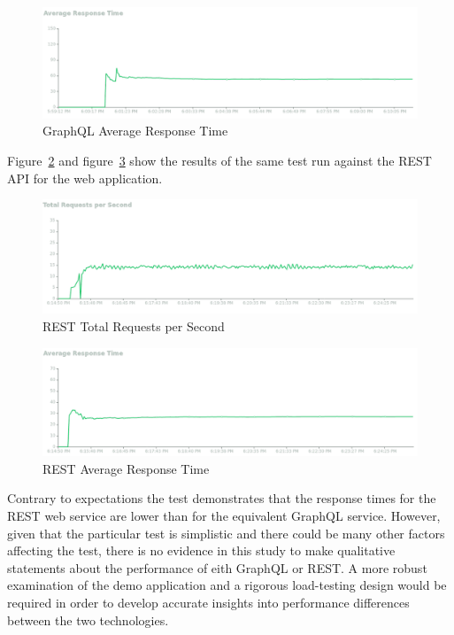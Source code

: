 \begin{figure}[htb]
  \centering\includegraphics[width=\columnwidth]
  {./images/graphql_response.png}
  \caption{GraphQL Average Response Time}\label{f:graphql_response}
\end{figure}

Figure~\ref{f:rest_requests} and figure~\ref{f:rest_response} show the results 
of the same test run against the REST API for the web application.

\begin{figure}[htb]
  \centering\includegraphics[width=\columnwidth]
  {./images/rest_requests.png}
  \caption{REST Total Requests per Second}\label{f:rest_requests}
\end{figure}

\begin{figure}[htb]
  \centering\includegraphics[width=\columnwidth]
  {./images/rest_response.png}
  \caption{REST Average Response Time}\label{f:rest_response}
\end{figure}

Contrary to expectations the test demonstrates that the response times for the 
REST web service are lower than for the equivalent GraphQL service.  However, 
given that the particular test is simplistic and there could be many other 
factors affecting the test, there is no evidence in this study to make 
qualitative statements about the performance of eith GraphQL or REST.  A more 
robust examination of the demo application and a rigorous load-testing design 
would be required in order to develop accurate insights into performance 
differences between the two technologies.

